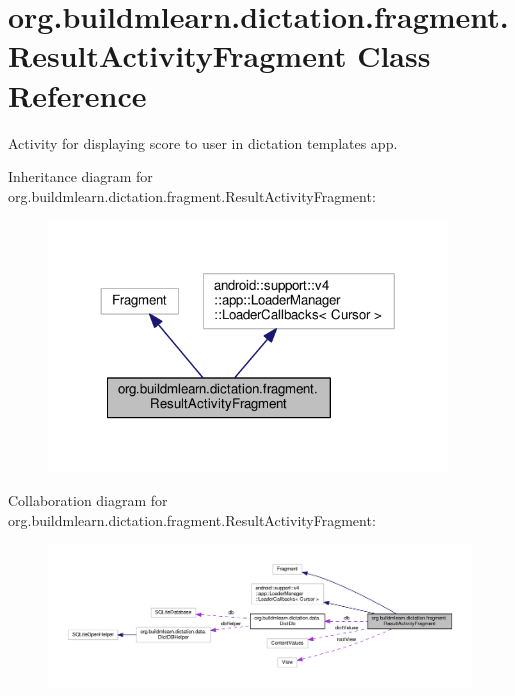\hypertarget{classorg_1_1buildmlearn_1_1dictation_1_1fragment_1_1ResultActivityFragment}{}\section{org.\+buildmlearn.\+dictation.\+fragment.\+Result\+Activity\+Fragment Class Reference}
\label{classorg_1_1buildmlearn_1_1dictation_1_1fragment_1_1ResultActivityFragment}


Activity for displaying score to user in dictation template\textquotesingle{}s app.  




Inheritance diagram for org.\+buildmlearn.\+dictation.\+fragment.\+Result\+Activity\+Fragment\+:
\nopagebreak
\begin{figure}[H]
\begin{center}
\leavevmode
\includegraphics[width=300pt]{classorg_1_1buildmlearn_1_1dictation_1_1fragment_1_1ResultActivityFragment__inherit__graph}
\end{center}
\end{figure}


Collaboration diagram for org.\+buildmlearn.\+dictation.\+fragment.\+Result\+Activity\+Fragment\+:
\nopagebreak
\begin{figure}[H]
\begin{center}
\leavevmode
\includegraphics[width=350pt]{classorg_1_1buildmlearn_1_1dictation_1_1fragment_1_1ResultActivityFragment__coll__graph}
\end{center}
\end{figure}
